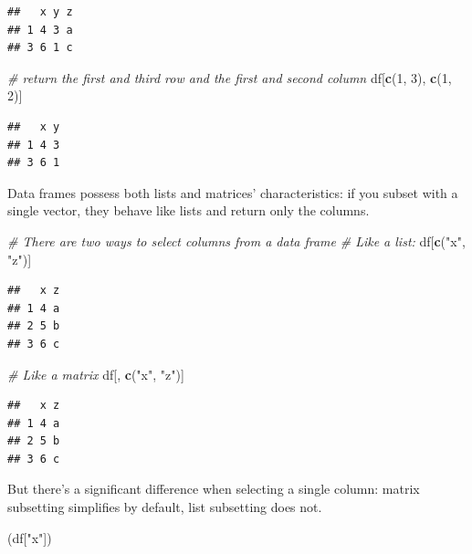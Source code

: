 \documentclass[
]{book}
\newenvironment{Shaded}{\begin{snugshade}}{\end{snugshade}}
\newcommand{\CommentTok}[1]{\textcolor[rgb]{0.56,0.35,0.01}{\textit{#1}}}
\newcommand{\DecValTok}[1]{\textcolor[rgb]{0.00,0.00,0.81}{#1}}
\newcommand{\FunctionTok}[1]{\textcolor[rgb]{0.13,0.29,0.53}{\textbf{#1}}}
\newcommand{\NormalTok}[1]{#1}
\newcommand{\StringTok}[1]{\textcolor[rgb]{0.31,0.60,0.02}{#1}}
\begin{document}
\begin{verbatim}
##   x y z
## 1 4 3 a
## 3 6 1 c
\end{verbatim}

\begin{Shaded}
\begin{Highlighting}[]
\CommentTok{\# return the first and third row and the first and second column}
\NormalTok{df[}\FunctionTok{c}\NormalTok{(}\DecValTok{1}\NormalTok{, }\DecValTok{3}\NormalTok{), }\FunctionTok{c}\NormalTok{(}\DecValTok{1}\NormalTok{, }\DecValTok{2}\NormalTok{)]}
\end{Highlighting}
\end{Shaded}

\begin{verbatim}
##   x y
## 1 4 3
## 3 6 1
\end{verbatim}

Data frames possess both lists and matrices' characteristics: if you subset with a single vector, they behave like lists and return only the columns.

\begin{Shaded}
\begin{Highlighting}[]
\CommentTok{\# There are two ways to select columns from a data frame}
\CommentTok{\# Like a list:}
\NormalTok{df[}\FunctionTok{c}\NormalTok{(}\StringTok{"x"}\NormalTok{, }\StringTok{"z"}\NormalTok{)]}
\end{Highlighting}
\end{Shaded}

\begin{verbatim}
##   x z
## 1 4 a
## 2 5 b
## 3 6 c
\end{verbatim}

\begin{Shaded}
\begin{Highlighting}[]
\CommentTok{\# Like a matrix}
\NormalTok{df[, }\FunctionTok{c}\NormalTok{(}\StringTok{"x"}\NormalTok{, }\StringTok{"z"}\NormalTok{)]}
\end{Highlighting}
\end{Shaded}

\begin{verbatim}
##   x z
## 1 4 a
## 2 5 b
## 3 6 c
\end{verbatim}

But there's a significant difference when selecting a single column: matrix subsetting simplifies by default, list subsetting does not.

\begin{Shaded}
\begin{Highlighting}[]
\NormalTok{(df[}\StringTok{"x"}\NormalTok{])}
\end{Highlighting}
\end{Shaded}
\end{document}
